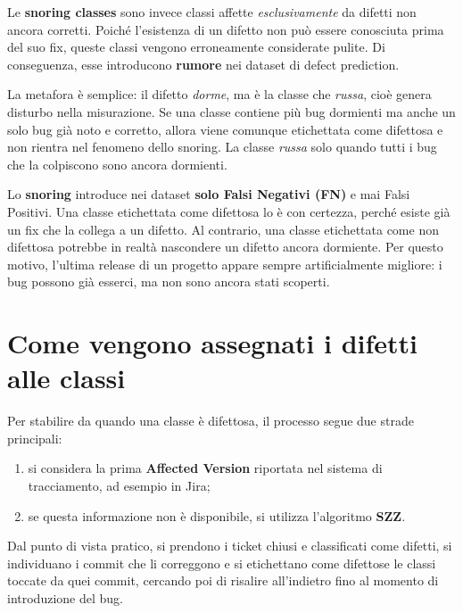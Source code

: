 Le \textbf{snoring classes} sono invece classi affette \emph{esclusivamente} da difetti non ancora corretti. Poiché l'esistenza di un difetto non può essere conosciuta prima del suo fix, queste classi vengono erroneamente considerate pulite. Di conseguenza, esse introducono \textbf{rumore} nei dataset di defect prediction.

\begin{notaprof}
La metafora è semplice: il difetto \emph{dorme}, ma è la classe che \emph{russa}, cioè genera disturbo nella misurazione. Se una classe contiene più bug dormienti ma anche un solo bug già noto e corretto, allora viene comunque etichettata come difettosa e non rientra nel fenomeno dello snoring. La classe \emph{russa} solo quando tutti i bug che la colpiscono sono ancora dormienti.
\end{notaprof}

\begin{notaesame}
Lo \textbf{snoring} introduce nei dataset \textbf{solo Falsi Negativi (FN)} e mai Falsi Positivi. Una classe etichettata come difettosa lo è con certezza, perché esiste già un fix che la collega a un difetto. Al contrario, una classe etichettata come non difettosa potrebbe in realtà nascondere un difetto ancora dormiente. Per questo motivo, l'ultima release di un progetto appare sempre artificialmente migliore: i bug possono già esserci, ma non sono ancora stati scoperti.
\end{notaesame}

\section{Come vengono assegnati i difetti alle classi}

Per stabilire da quando una classe è difettosa, il processo segue due strade principali:

\begin{enumerate}
    \item si considera la prima \textbf{Affected Version} riportata nel sistema di tracciamento, ad esempio in Jira;
    \item se questa informazione non è disponibile, si utilizza l'algoritmo \textbf{SZZ}.
\end{enumerate}

\begin{notaprof}
Dal punto di vista pratico, si prendono i ticket chiusi e classificati come difetti, si individuano i commit che li correggono e si etichettano come difettose le classi toccate da quei commit, cercando poi di risalire all'indietro fino al momento di introduzione del bug.
\end{notaprof}

